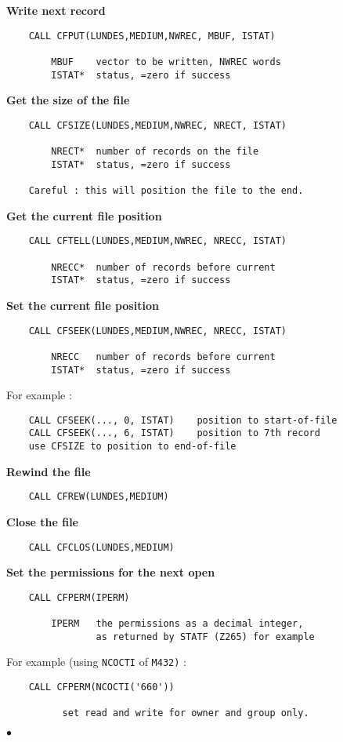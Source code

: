 \newpage
{\bf Write next record}
\begin{verbatim}
    CALL CFPUT(LUNDES,MEDIUM,NWREC, MBUF, ISTAT)
 
        MBUF    vector to be written, NWREC words
        ISTAT*  status, =zero if success
\end{verbatim}
 
{\bf Get the size of the file}
\begin{verbatim}
    CALL CFSIZE(LUNDES,MEDIUM,NWREC, NRECT, ISTAT)
 
        NRECT*  number of records on the file
        ISTAT*  status, =zero if success
 
    Careful : this will position the file to the end.
\end{verbatim}
 
{\bf Get the current file position}
\begin{verbatim}
    CALL CFTELL(LUNDES,MEDIUM,NWREC, NRECC, ISTAT)
 
        NRECC*  number of records before current
        ISTAT*  status, =zero if success
\end{verbatim}
 
{\bf Set the current file position}
\begin{verbatim}
    CALL CFSEEK(LUNDES,MEDIUM,NWREC, NRECC, ISTAT)
 
        NRECC   number of records before current
        ISTAT*  status, =zero if success
\end{verbatim}
   For example :
\begin{verbatim}
    CALL CFSEEK(..., 0, ISTAT)    position to start-of-file
    CALL CFSEEK(..., 6, ISTAT)    position to 7th record
    use CFSIZE to position to end-of-file
\end{verbatim}
 
{\bf Rewind the file}
\begin{verbatim}
    CALL CFREW(LUNDES,MEDIUM)
\end{verbatim}
 
{\bf Close the file}
\begin{verbatim}
    CALL CFCLOS(LUNDES,MEDIUM)
\end{verbatim}
 
{\bf Set the permissions for the next open}
\begin{verbatim}
    CALL CFPERM(IPERM)
 
        IPERM   the permissions as a decimal integer,
                as returned by STATF (Z265) for example
\end{verbatim}
   For example (using {\tt NCOCTI} of {\tt M432)} :
\begin{verbatim}
    CALL CFPERM(NCOCTI('660'))
 
          set read and write for owner and group only.
\end{verbatim}
$\bullet$
